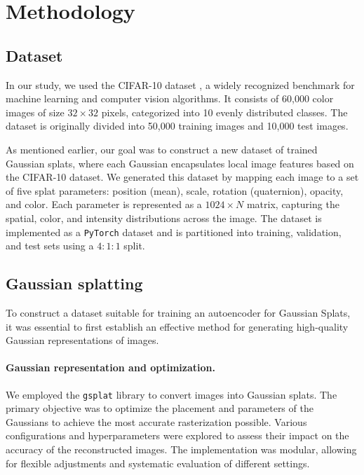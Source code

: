 \section{Methodology}
\label{sec:methodology}

\subsection{Dataset}
In our study, we used the CIFAR-10 dataset \cite{krizhevsky2009learningml}, a widely recognized benchmark for machine learning and computer vision algorithms. It consists of 60,000 color images of size $32 \times 32$ pixels, categorized into 10 evenly distributed classes. The dataset is originally divided into 50,000 training images and 10,000 test images.

As mentioned earlier, our goal was to construct a new dataset of trained Gaussian splats, where each Gaussian encapsulates local image features based on the CIFAR-10 dataset. We generated this dataset by mapping each image to a set of five splat parameters: position (mean), scale, rotation (quaternion), opacity, and color. Each parameter is represented as a $1024 \times N$ matrix, capturing the spatial, color, and intensity distributions across the image. The dataset is implemented as a \texttt{PyTorch} dataset \cite{paszke2019pytorchai} and is partitioned into training, validation, and test sets using a $4 : 1 : 1$ split.

\subsection{Gaussian splatting}
To construct a dataset suitable for training an autoencoder for Gaussian Splats, it was essential to first establish an effective method for generating high-quality Gaussian representations of images.

\paragraph{Gaussian representation and optimization.}
We employed the \texttt{gsplat} library \cite{ye2024gsplatao} to convert images into Gaussian splats. The primary objective was to optimize the placement and parameters of the Gaussians to achieve the most accurate rasterization possible. Various configurations and hyperparameters were explored to assess their impact on the accuracy of the reconstructed images. The implementation was modular, allowing for flexible adjustments and systematic evaluation of different settings. 


